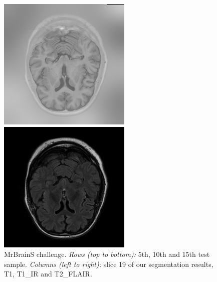 \documentclass[runningheads,a4paper]{llncs}
\begin{document}
\begin{figure}
\begin{minipage}{.24\textwidth}
  \end{minipage}
  \begin{minipage}{.24\textwidth}
 \includegraphics[width=.99\linewidth]{./images/sl19-v15-test-t1-ir.png}
  \end{minipage}
  \begin{minipage}{.24\textwidth}
 \includegraphics[width=.99\linewidth]{./images/sl19-v15-test-t2-flair.png}
  \end{minipage}
  \caption{MrBrainS challenge. \emph{Rows (top to bottom):} 5th, 10th and 15th test sample. \emph{Columns (left to right):} slice 19 of our segmentation results, T1, T1\_IR and T2\_FLAIR.}
   \label{visualresultschallenge}

\end{figure}
\end{document}
